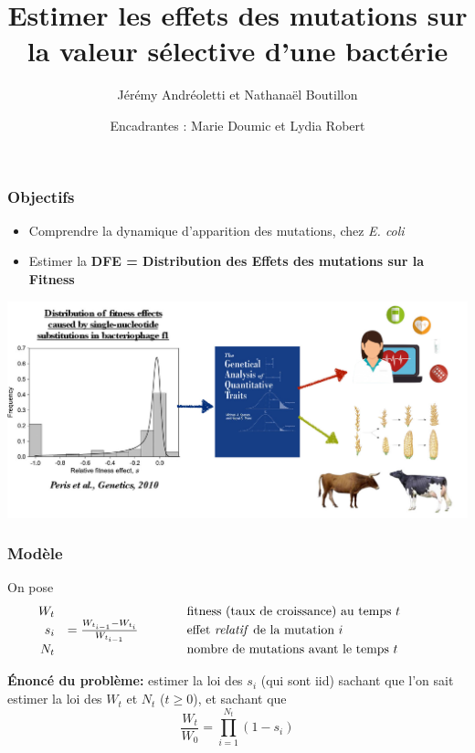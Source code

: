 \documentclass{beamer}
\title[Mutations]{Estimer les effets des mutations sur la valeur sélective d’une bactérie}
\date[2020 -- 2021]{Encadrantes : Marie Doumic et Lydia Robert}
\author[J. Andréoletti, N. Boutillon]{Jérémy Andréoletti et Nathanaël Boutillon}
\newcommand{\comment}[1]{\hspace{1cm}\text{#1}\hspace{1cm}}
\begin{document}
\begin{frame}
  \titlepage
\end{frame}


\begin{frame}
  \frametitle{Objectifs}
  \begin{itemize}[label=$\bullet$]
  \item Comprendre la dynamique d'apparition des mutations, chez \emph{E. coli}
  \item Estimer la \textbf{DFE = Distribution des Effets des mutations sur la Fitness}
  \end{itemize}
  
  \vspace{3mm}

  \begin{centering}
    \includegraphics[scale=0.2]{img/DFE_phage_2010.jpg}
  \end{centering} 
\end{frame}

\begin{frame}
  \frametitle{Modèle}
  On pose
  \[
  \begin{array}{r l l}
    W_t &&\comment{fitness (taux de croissance) au temps $t$}\\
    s_i&=\frac{W_{t_{i-1}}-W_{t_i}}{W_{t_{i-1}}}&\comment{effet \emph{relatif} de la mutation $i$}\\
    N_t &&\comment{nombre de mutations avant le temps $t$}
  \end{array}
  \]

\vspace{0.5cm}\pause

  \textbf{Énoncé du problème:} estimer la loi des $s_i$ (qui sont iid) sachant que l'on sait estimer la loi des $W_t$ et $N_t$ ($t\geqslant 0$), et sachant que \[\frac{W_t}{W_0}=\prod_{i=1}^{N_t}(1-s_i)\]
\end{frame}
\end{document}
